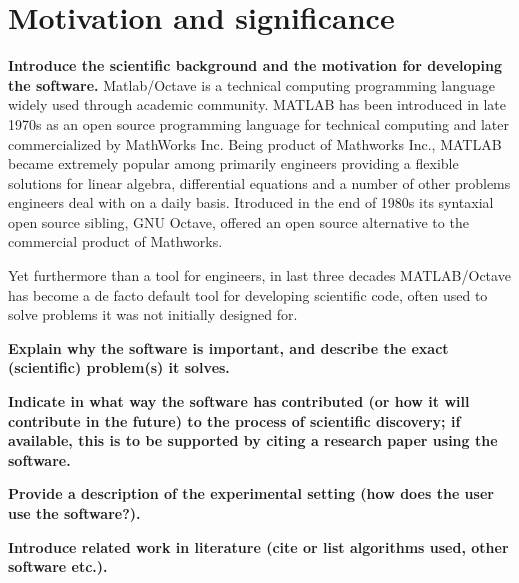 \section{Motivation and significance}
\label{} 

\textbf{Introduce the scientific background and the motivation for developing the software.}
Matlab/Octave is a technical computing programming language widely used through academic community. MATLAB has been introduced in late 1970s as an open source programming language for technical computing and later commercialized by MathWorks Inc. Being product of Mathworks Inc., MATLAB became extremely popular among primarily engineers providing a flexible solutions for linear algebra, differential equations and a number of other problems engineers deal with on a daily basis. Itroduced in the end of 1980s its syntaxial open source sibling, GNU Octave, offered an open source alternative to the commercial product of Mathworks.

Yet furthermore than a tool for engineers, in last three decades MATLAB/Octave has become a de facto default tool for developing scientific code, often used to solve problems it was not initially designed for.    

\textbf{Explain why the software is important, and describe the exact (scientific) problem(s) it solves.}


\textbf{Indicate in what way the software has contributed (or how it will contribute in the future) to the process of scientific discovery; if available, this is to be supported by citing a research paper using the software.}


\textbf{Provide a description of the experimental setting (how does the user use the software?).}


\textbf{Introduce related work in literature (cite or list algorithms used, other software etc.).}

    
